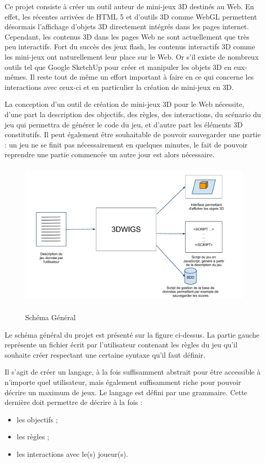 Ce projet consiste à créer un outil auteur de mini-jeux 3D destinés au Web.
En effet, les récentes arrivées de HTML 5 et d'outils 3D comme WebGL permettent désormais l'affichage d'objets 3D directement
intégrés dans les pages internet.
Cependant, les contenus 3D dans les pages Web ne sont actuellement que très peu interactifs.
Fort du succès des jeux flash, les contenus interactifs 3D comme les mini-jeux ont naturellement leur place sur le Web.
Or s'il existe de nombreux outils tel que Google SketchUp pour créer et manipuler les objets 3D en eux-mêmes.
Il reste tout de même un effort important à faire en ce qui concerne les interactions avec ceux-ci et en particulier la création de mini-jeux en 3D.

\vspace{0.5cm}

La conception d'un outil de création de mini-jeux 3D pour le Web nécessite, d'une part la description des objectifs, des règles, des interactions, 
du scénario du jeu qui permettra de générer le code du jeu, et d'autre part les éléments 3D constitutifs.
Il peut également être souhaitable de pouvoir sauvegarder une partie :
un jeu ne se finit pas nécessairement en quelques minutes, le fait de pouvoir reprendre une partie commencée un autre jour est alors nécessaire.

\begin{figure}[h]
 \centering
 \includegraphics[height=7cm]{img/schema_general}
 \label{fig:schemaprojet}
 \caption{Schéma Général}
\end{figure}

Le schéma général du projet est présenté sur la figure ci-dessus.
La partie gauche représente un fichier écrit par l'utilisateur contenant les règles du jeu qu'il souhaite créer respectant
une certaine syntaxe qu'il faut définir.

Il s'agit de créer un langage, à la fois suffisamment abstrait pour être accessible à n'importe quel utilisateur, mais également suffisamment riche
pour pouvoir décrire un maximum de jeux.
Le langage est défini par une grammaire.
Cette dernière doit permettre de décrire à la fois :
\begin{itemize}
 \item les objectifs ;
 \item les règles ;
 \item les interactions avec le(s) joueur(s).
\end{itemize}

